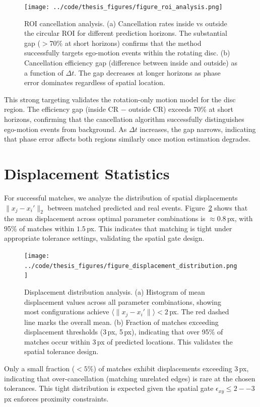 \begin{figure}[t]
  \centering
  \texttt{[image: ../code/thesis\_figures/figure\_roi\_analysis.png]}
  \caption{ROI cancellation analysis. (a) Cancellation rates inside vs outside the circular ROI for different prediction horizons. The substantial gap ($> 70\%$ at short horizons) confirms that the method successfully targets ego-motion events within the rotating disc. (b) Cancellation efficiency gap (difference between inside and outside) as a function of $\Delta t$. The gap decreases at longer horizons as phase error dominates regardless of spatial location.}
  \label{fig:roi_comparison}
\end{figure}

This strong targeting validates the rotation-only motion model for the disc region. The efficiency gap (inside CR $-$ outside CR) exceeds 70\% at short horizons, confirming that the cancellation algorithm successfully distinguishes ego-motion events from background. As $\Delta t$ increases, the gap narrows, indicating that phase error affects both regions similarly once motion estimation degrades.

\section{Displacement Statistics}

For successful matches, we analyze the distribution of spatial displacements $\|x_j - x_i'\|_2$ between matched predicted and real events. Figure~\ref{fig:displacement} shows that the mean displacement across optimal parameter combinations is $\approx 0.8$\,px, with 95\% of matches within $1.5$\,px. This indicates that matching is tight under appropriate tolerance settings, validating the spatial gate design.

\begin{figure}[t]
  \centering
  \texttt{[image: ../code/thesis\_figures/figure\_displacement\_distribution.png]}
  \caption{Displacement distribution analysis. (a) Histogram of mean displacement values across all parameter combinations, showing most configurations achieve $\langle \|x_j - x_i'\| \rangle < 2$\,px. The red dashed line marks the overall mean. (b) Fraction of matches exceeding displacement thresholds (3\,px, 5\,px), indicating that over 95\% of matches occur within 3\,px of predicted locations. This validates the spatial tolerance design.}
  \label{fig:displacement}
\end{figure}

Only a small fraction ($< 5\%$) of matches exhibit displacements exceeding 3\,px, indicating that over-cancellation (matching unrelated edges) is rare at the chosen tolerances. This tight distribution is expected given the spatial gate $\epsilon_{xy} \leq 2--3$\,px enforces proximity constraints.

